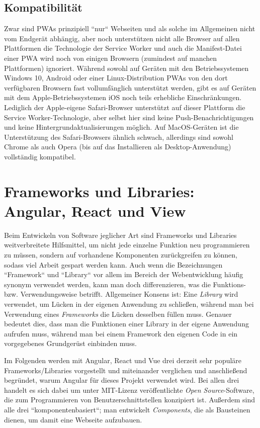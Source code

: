 \subsection{Kompatibilität}
Zwar sind \aclp{PWA} prinzipiell ``nur`` Webseiten und als solche im Allgemeinen nicht vom Endgerät abhängig, aber noch unterstützen nicht alle Browser auf allen Plattformen die Technologie der Service Worker und auch die Manifest-Datei einer \acs{PWA} wird noch von einigen Browsern (zumindest auf manchen Plattformen) ignoriert. Während sowohl auf Geräten mit den Betriebssystemen Windows 10, Android oder einer Linux-Distribution \acsp{PWA} von den dort verfügbaren Browsern fast vollumfänglich unterstützt werden, gibt es auf Geräten mit dem Apple-Betriebssystemen iOS noch teils erhebliche Einschränkungen. Lediglich der Apple-eigene Safari-Browser unterstützt auf dieser Plattform die Service Worker-Technologie, aber selbst hier sind keine Push-Benachrichtigungen und keine Hintergrundaktualisierungen möglich.
Auf MacOS-Geräten ist die Unterstützung des Safari-Browsers ähnlich schwach, allerdings sind sowohl Chrome als auch Opera (bis auf das Installieren als Desktop-Anwendung) vollständig kompatibel.\cite{Compatibility}

\section{Frameworks und Libraries: Angular, React und View}
\label{sec:technologies:frameworks}

Beim Entwickeln von Software jeglicher Art sind Frameworks und Libraries weitverbreitete Hilfsmittel, um nicht jede einzelne Funktion neu programmieren zu müssen, sondern auf vorhandene Komponenten zurückgreifen zu können, sodass viel Arbeit gespart werden kann. Auch wenn die Bezeichnungen ``Framework`` und ``Library`` vor allem im Bereich der Webentwicklung häufig synonym verwendet werden, kann man doch differenzieren, was die Funktions- bzw. Verwendungsweise betrifft. Allgemeiner Konsens ist: Eine \textit{Library} wird verwendet, um Lücken in der eigenen Anwendung zu schließen, während man bei Verwendung eines \textit{Frameworks} die Lücken desselben füllen muss. Genauer bedeutet dies, dass man die Funktionen einer Library in der eigene Anwendung aufrufen muss, während man bei einem Framework den eigenen Code in ein vorgegebenes Grundgerüst einbinden muss\cite{FrameVsLib}.

Im Folgenden werden mit Angular, React und Vue drei derzeit sehr populäre Frameworks/Libraries vorgestellt und miteinander verglichen\cite{AngularReactVue} und anschließend begründet, warum Angular für dieses Projekt verwendet wird. Bei allen drei handelt es sich dabei um unter MIT-Lizenz veröffentlichte \textit{Open Source}-Software, die zum Programmieren von Benutzerschnittstellen konzipiert ist. Außerdem sind alle drei ``komponentenbasiert``; man entwickelt \textit{Components}, die als Bausteinen dienen, um damit eine Webseite aufzubauen.

